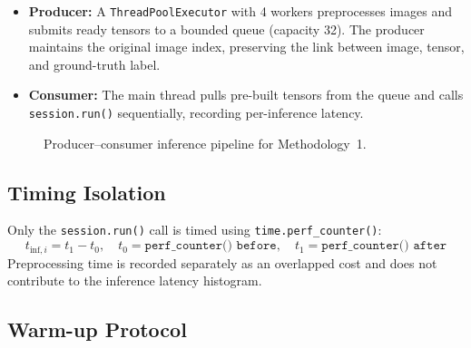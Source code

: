 \begin{itemize}[itemsep=1pt, topsep=3pt]
    \item \textbf{Producer:} A \texttt{ThreadPoolExecutor} with 4 workers
          preprocesses images and submits ready tensors to a bounded queue
          (capacity 32). The producer maintains the original image index,
          preserving the link between image, tensor, and ground-truth label.
    \item \textbf{Consumer:} The main thread pulls pre-built tensors from the
          queue and calls \texttt{session.run()} sequentially, recording
          per-inference latency.
\end{itemize}

\begin{figure}[H]
\centering
{}
\caption{Producer--consumer inference pipeline for Methodology~1.}
\label{fig:m1_pipeline}
\end{figure}

\subsection{Timing Isolation}

Only the \texttt{session.run()} call is timed using
\texttt{time.perf\_counter()}:
\begin{equation}
    t_{\text{inf},i} = t_1 - t_0,\quad
    t_0 = \texttt{perf\_counter()\ before},\quad
    t_1 = \texttt{perf\_counter()\ after}
\end{equation}
Preprocessing time is recorded separately as an overlapped cost and does not
contribute to the inference latency histogram.

\subsection{Warm-up Protocol}


